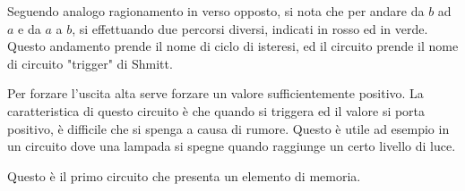 \documentclass[../template]{subfiles}
\begin{document}
\begin{center}
    \centering
\end{center}

Seguendo analogo ragionamento in verso opposto, si nota che per andare da $b$ ad $a$ e da $a$ a $b$, si effettuando due percorsi diversi, indicati in rosso ed in verde. Questo andamento prende il nome di ciclo di isteresi, ed il circuito prende il nome di circuito "trigger" di Shmitt.

Per forzare l'uscita alta serve forzare un valore sufficientemente positivo. La caratteristica di questo circuito è che quando si triggera ed il valore si porta positivo, è difficile che si spenga a causa di rumore. Questo è utile ad esempio in un circuito dove una lampada si spegne quando raggiunge un certo livello di luce.

Questo è il primo circuito che presenta un elemento di memoria.
\end{document}
